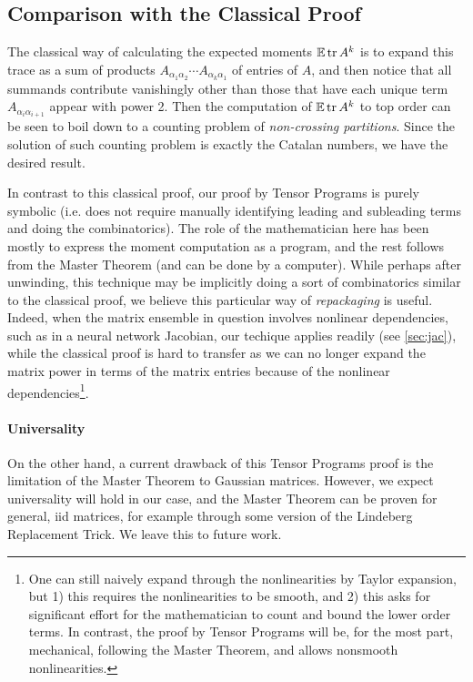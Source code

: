\documentclass[main.tex]{subfiles}
\begin{document}
\subsection{Comparison with the Classical Proof}

The classical way of calculating the expected moments $\operatorname*{\mathbb{E}}\operatorname{tr} A^{k}$ is to expand this trace as a sum of products $A_{\alpha_{1}\alpha_{2}}\cdots A_{\alpha_{k}\alpha_{1}}$ of entries of $A$, and then notice that all summands contribute vanishingly other than those that have each unique term $A_{\alpha_{i}\alpha_{i+1}}$ appear with power 2. Then the computation of $\operatorname*{\mathbb{E}}\operatorname{tr} A^{k}$ to top order can be seen to boil down to a counting problem of \emph{non-crossing partitions}. Since the solution of such counting problem is exactly the Catalan numbers, we have the desired result.

In contrast to this classical proof, our proof by Tensor Programs is purely symbolic (i.e. does not require manually identifying leading and subleading terms and doing the combinatorics).
The role of the mathematician here has been mostly to express the moment computation as a \netsort{} program, and the rest follows from the Master Theorem (and can be done by a computer).
While perhaps after unwinding, this technique may be implicitly doing a sort of combinatorics similar to the classical proof, we believe this particular way of \emph{repackaging} is useful.
Indeed, when the matrix ensemble in question involves nonlinear dependencies, such as in a neural network Jacobian, our techique applies readily (see \cref{sec:jac}), while the classical proof is hard to transfer as we can no longer expand the matrix power in terms of the matrix entries because of the nonlinear dependencies\footnote{One can still naively expand through the nonlinearities by Taylor expansion, but 1) this requires the nonlinearities to be smooth, and 2) this asks for significant effort for the mathematician to count and bound the lower order terms. In contrast, the proof by Tensor Programs will be, for the most part, mechanical, following the Master Theorem, and allows nonsmooth nonlinearities.}.

\paragraph{Universality}
On the other hand, a current drawback of this Tensor Programs proof is the limitation of the Master Theorem to Gaussian matrices.
However, we expect universality will hold in our case, and the Master Theorem can be proven for general, iid matrices, for example through some version of the Lindeberg Replacement Trick.
We leave this to future work.
\end{document}
